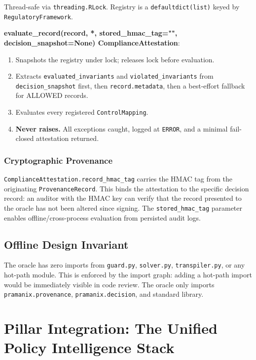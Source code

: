 \documentclass[12pt,a4paper,oneside]{report}
\newcommand{\fname}[1]{\texttt{#1}}          %
\newcommand{\code}[1]{\texttt{#1}}           %
\begin{document}
Thread-safe via \code{threading.RLock}.  Registry is a
\code{defaultdict(list)} keyed by \code{RegulatoryFramework}.

\textbf{evaluate\_record(record, *, stored\_hmac\_tag="", decision\_snapshot=None)
\textrightarrow{} ComplianceAttestation}:

\begin{enumerate}
  \item Snapshots the registry under lock; releases lock before evaluation.
  \item Extracts \code{evaluated\_invariants} and \code{violated\_invariants}
        from \code{decision\_snapshot} first, then \code{record.metadata},
        then a best-effort fallback for ALLOWED records.
  \item Evaluates every registered \code{ControlMapping}.
  \item \textbf{Never raises.}  All exceptions caught, logged at
        \code{ERROR}, and a minimal fail-closed attestation returned.
\end{enumerate}

\subsubsection{Cryptographic Provenance}

\code{ComplianceAttestation.record\_hmac\_tag} carries the HMAC tag from the
originating \code{ProvenanceRecord}.  This binds the attestation to the
specific decision record: an auditor with the HMAC key can verify that the
record presented to the oracle has not been altered since signing.
The \code{stored\_hmac\_tag} parameter enables offline/cross-process
evaluation from persisted audit logs.

\subsection{Offline Design Invariant}

The oracle has zero imports from \fname{guard.py}, \fname{solver.py},
\fname{transpiler.py}, or any hot-path module.  This is enforced by the
import graph: adding a hot-path import would be immediately visible in code
review.  The oracle only imports \fname{pramanix.provenance},
\fname{pramanix.decision}, and standard library.

\section{Pillar Integration: The Unified Policy Intelligence Stack}
\end{document}
